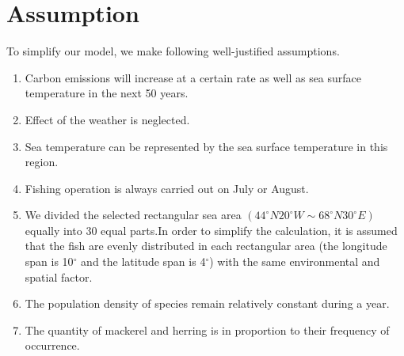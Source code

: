\documentclass{mcmthesis}
\begin{document}
\section{Assumption}
To simplify our model, we make following well-justified assumptions.
\begin{enumerate}[(1)]
\item Carbon emissions will increase at a certain rate as well as sea surface temperature in the next 50 years.
\item  Effect of the weather is neglected.
\item Sea temperature can be represented by the sea surface temperature in this region.
%
\item	Fishing operation is always carried out on July or August.
\item We divided the selected rectangular sea area $(44^\circ N20^\circ W\sim68^\circ N30^\circ E) $ equally into 30 equal parts.In order to simplify the calculation, it is assumed that the fish are evenly distributed in each rectangular area (the longitude span is 10$^\circ$ and the latitude span is 4$^\circ$) with the same environmental and spatial factor.
%
\item The population density of species remain relatively constant during a year.
\item The quantity of mackerel and herring is in proportion to their frequency of occurrence.
~\\~\\~\\~\\~\\~\\~\\~\\~\\~\\~\\
\end{enumerate}
\end{document}
